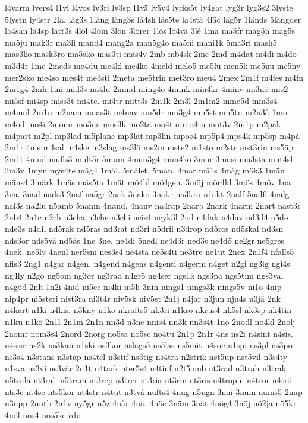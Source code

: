 {l4varm
lvers4
l1vi
l4vos
lv3ri
lv3sp
l1vä
lväv4
lycks5t
ly4gat
lyg3r
lyg3s2
3lyste
5lystn
ly4str
2lå.
låg3s
1lång
lång3s
lå4sk
lås5te
lå4stå
4läc
läg5r
1länds
5längder
lä4san
lä4sp
lätt3s
4löl
4löm
3lön
3lörer
1lös
lö4vä
3lé
1ma
ma5fr
mag5n
mag5s
ma5ju
mak3r
ma3li
mand4
mang2a
man5g4o
ma5ni
mani1k
5ma3ri
mash5
mas3ko
mask3ro
ma5skö
mas3ti
mas4v
2mb
mb4sk
2mc
2md
m4dat
m4di
m4do
m3d4r
1me
2meds
me4du
me4kl
me4ko
4meld
melo5
me5lu
men5k
me5nu
me5ny
mer2sko
me4so
mes4t
me3sti
2meta
me5trin
met3ro
meu4
2mex
2m1f
m4fes
m4fn
2m1g4
2mh
1mi
mid3s
mi4lu
2mind
ming4o
4mink
min4kr
4minv
mi3nö
mis2
mi5sf
mi4sp
miss3t
mi4te.
mi4tr
mitt3s
2m1k
2m3l
2m1m2
mme5d
mm3s4
m4mul
2m1n
m2nam
mnas3t
m4nav
mn5dr
mn3g4
mn5st
mn5tu
m2n3å
1mo
m4od
mo4i
2momr
mo3na
mos3k
mo2ta
mo4tin
mo4tu
mot3v
2m1p
m2pak
m4part
m2pl
mp3lad
m5plane
mp3lat
mp3lin
mpos4
mp5p4
mps4k
mp5sp
m4på
2m1r
4ms
m4sal
m4ske
m3slag
ms3lä
ms2m
mste2
m1sto
m2str
mst3rin
ms5äp
2m1t
4mud
mulls3
mult5r
5mum
4mun3g4
mun4ko
3mur
3musi
mu3sta
mut4sl
2m3v
1myn
mys4te
måg4
1mål.
5målet.
5mån.
4mår
må1s
4mäg
mäk3
1män
mäns4
3märk
1mäs
mäs5ta
1mät
mö4bl
mö4gen.
3möj
mör4kl
3mös
4möv
1na
3na.
3nad
nads3
2naf
na5gr
2nak
3nako
3nakr
na3kro
n1akt
2nalf
5nalfl
4nalg
nal3s
na2lu
n5amb
5namn
4nand.
4nanv
na4rap
2narb
2nark
4narm
2nart
nast3r
2nb4
2n1c
n2ch
n3cha
n3che
n3chi
ncis4
ncyk3l
2nd
n4dak
n4dav
nd3d4
n5de
nde3s
n4dil
nd5rak
nd5ras
nd3rat
nd3ri
n5dril
n3drop
nd5ros
nd5skal
nd3sn
nds3or
nds5vä
nd5ås
1ne
3ne.
ne4di
5nedl
ne4d3r
ned3s
ne4dö
ne2gr
ne5gres
4nek.
ne5ly
4nenl
ner5sm
nes3s4
ne4sta
ne5s4ti
ne3tre
ne1ut
2nex
2n1f4
nfalls5
nfis3
2ng1
n4gar
n4gen.
n4gend
n4gens
n4genti
n4germ
n4get
n2gi
ng3ig
ngi4s
ng4ly
n2go
ng5om
ng3or
ng3rad
n4grö
ng4ser
ngs1k
ngs3pa
ngs5tim
ngs3val
n4göd
2nh
1n2i
4nid
ni5ec
ni4ki
ni5li
3nin
nings1
nings3k
nings5v
ni1o
4nip
nip4pr
ni5steri
nist3ra
ni3t4r
niv5sk
niv5st
2n1j
n4jar
n3jun
nju4s
n3jä
2nk
n4kart
n1ki
n4kis.
n3kny
n1ko
nkrafts5
nk3ri
n1kro
nkrus4
nk5sl
nk3sp
nk4tin
n1ku
n1kö
2n1l
2n1m
2n1n
nn3d
n3ne
nnis4
nn3k
nn3s4t
1no
2nodl
no4kl
2nolj
2nomr
nom3s4
2nord
2norg
no5sa
no5sc
no4tu
2n1p
2n1r
4ns
ns2i
n4sint
n4sis.
n4sise
ns2k
ns3kan
n1ski
ns3kor
nslags5
ns5las
ns5mit
n4soc
n1spi
ns3pl
ns3po
ns3s4
n3stans
n3stap
ns4tel
n3stif
ns3tig
ns4tra
n2strik
nst5up
nst5vil
n3s4ty
n1sva
ns3vi
ns3vär
2n1t
n4tark
nter5s4
n4tinf
n2t5omb
nt3rad
n3trah
n3trak
n5trala
nt3rali
n5tram
nt3rep
n3trer
nt3ria
nt3rin
nt3ris
n4tropin
n4tror
n4trö
nts3c
nt4se
nts5kor
nt4str
n4tut
n3två
nufts4
4nug
n5ugn
3nui
3num
nums5
2nup
n3upp
2nutb
2n1v
ny5gr
n5z
4når
4nä.
4näc
3näm
3nät
4nög4
3nöj
nö2ja
nö5kr
4nöl
nös4
nös5ke
o1a
}
